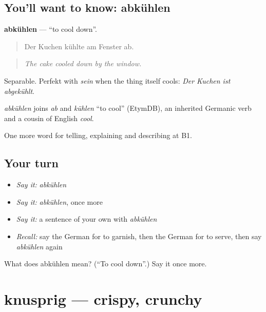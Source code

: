 \subsection*{You'll want to know: abkühlen}
\textbf{abkühlen} — \textquotedblleft{}to cool down\textquotedblright{}.

\begin{quote}
Der Kuchen kühlte am Fenster ab.
\end{quote}

\begin{quote}
\emph{The cake cooled down by the window.}
\end{quote}

Separable. Perfekt with \emph{sein} when the thing itself cools: \emph{Der Kuchen ist abgekühlt}.

\begin{cousinweb}
\emph{abkühlen} joins \emph{ab} and \emph{kühlen} \textquotedblleft{}to cool\textquotedblright{} (EtymDB), an inherited Germanic verb and a cousin of English \emph{cool}.
\end{cousinweb}

\begin{grammarlens}[title={What you've built}]
One more word for telling, explaining and describing at B1.
\end{grammarlens}

\subsection*{Your turn}
\begin{itemize}
\raggedright
  \item \emph{Say it:} \emph{abkühlen}
  \item \emph{Say it:} \emph{abkühlen}, once more
  \item \emph{Say it:} a sentence of your own with \emph{abkühlen}
  \item \emph{Recall:} say the German for to garnish, then the German for to serve, then say \emph{abkühlen} again
\end{itemize}

\begin{tcolorbox}[breakable,colback=teal!4,colframe=teal!35!black,title={Before you move on}]
What does abkühlen mean? (\textquotedblleft{}To cool down\textquotedblright{}.) Say it once more.
\end{tcolorbox}
\section[knusprig]{knusprig — crispy, crunchy}

